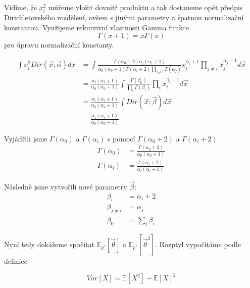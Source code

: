 Vidíme, že $x_i^2$ můžeme vložit dovnitř produktu a tak dostaneme opět předpis Dirichletovského rozdělení, ovšem s jinými parametry a špatnou normalizační konstantou. Využijeme rekurzivní vlastnosti Gamma funkce
\begin{equation}
\Gamma(x+1) = x \Gamma(x)
\end{equation}
pro úpravu normalizační konstanty.

\begin{align}
\int x_i^2 Dir(\vec x; \vec\alpha) dx &=
\int \frac{\Gamma(\alpha_0 + 2) \alpha_i (\alpha_i + 1)}
		{\alpha_0 (\alpha_0 + 1) \Gamma(\alpha_i + 2) \prod_{j \ne i} \Gamma(\alpha_j)}
	x_i^{\alpha_i + 1} \prod_{j \ne i} x_j^{\alpha_j - 1} d\vec x
\\
&= \frac{\alpha_i (\alpha_i + 1)}
		{\alpha_0 (\alpha_0 + 1)}
	\int \frac{\Gamma(\beta_0)}
		{\prod_i \Gamma(\beta_i)}
	\prod_i x_i^{\beta_i - 1} d\vec x
\\
&= \frac{\alpha_i (\alpha_i + 1)}
		{\alpha_0 (\alpha_0 + 1)}
	\int Dir(\vec x; \vec\beta) d\vec x
\\
&= \frac{\alpha_i (\alpha_i + 1)}
		{\alpha_0 (\alpha_0 + 1)}
\end{align}

Vyjádřili jsme $\Gamma(\alpha_0)$ a $\Gamma(\alpha_i)$ s pomocí $\Gamma(\alpha_0 + 2)$ a $\Gamma(\alpha_i + 2)$
\begin{align}
\Gamma(\alpha_0) &= \frac{\Gamma(\alpha_0 + 2)}
				{\alpha_0(\alpha_0 + 1)}
\\
\Gamma(\alpha_i) &= \frac{\Gamma(\alpha_i + 2)}
				{\alpha_i(\alpha_i + 1)}
\end{align}

Následně jsme vytvořili nové parametry $\vec\beta$:
\begin{align}
\beta_i &= \alpha_i + 2 \\
\beta_{j \ne i} &= \alpha_j \\
\beta_0 &= \sum_i \beta_i
\end{align}

Nyní tedy dokážeme spočítat $\mathbb{E}_{p^*}[\vec\theta]$ a $\mathbb{E}_{p^*}[\vec\theta^2]$.
Rozptyl vypočítáme podle definice

\begin{equation}
	Var[X] = \mathbb{E}[X^2] - \mathbb{E}[X]^2
\end{equation}

